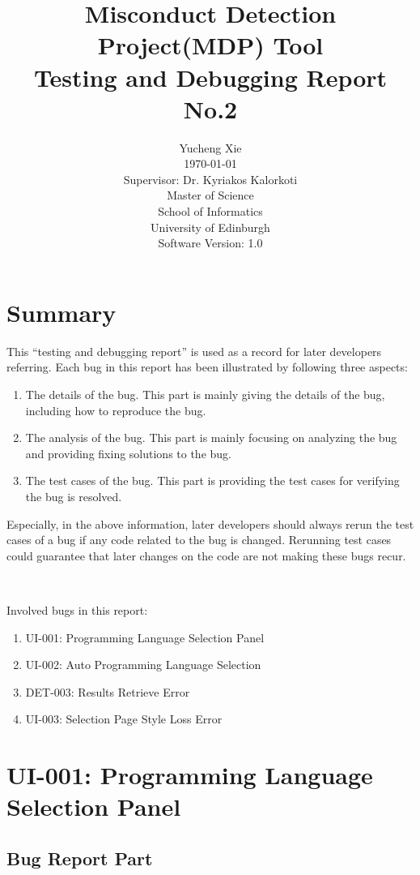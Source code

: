 \documentclass[twoside,a4paper]{refart}
\title{Misconduct Detection Project(MDP) Tool\\
Testing and Debugging Report No.2}
\author{Yucheng Xie \\
\today \\
Supervisor: Dr. Kyriakos Kalorkoti\\
Master of Science\\
School of Informatics\\
University of Edinburgh\\
Software Version: 1.0}
\date{}
\newcommand{\bugfirst}{UI-001: Programming Language Selection Panel}
\newcommand{\bugsecond}{UI-002: Auto Programming Language Selection}
\newcommand{\bugthird}{DET-003: Results Retrieve Error}
\newcommand{\bugfourth}{UI-003: Selection Page Style Loss Error}
\begin{document}
\maketitle

\tableofcontents

\newpage



\section{Summary} \label{sec:intr}
This \enquote{testing and debugging report} is used as a record for later developers referring. Each bug in this report has been illustrated by following three aspects:
\begin{enumerate}
\item The details of the bug. This part is mainly giving the details of the bug, including how to reproduce the bug.
\item The analysis of the bug. This part is mainly focusing on analyzing the bug and providing fixing solutions to the bug.
\item The test cases of the bug. This part is providing the test cases for verifying the bug is resolved.
\end{enumerate}

Especially, in the above information, later developers should always rerun the test cases of a bug if any code related to the bug is changed. Rerunning test cases could guarantee that later changes on the code are not making these bugs recur.

$\ $

Involved bugs in this report:
\begin{enumerate}
\item \bugfirst
\item \bugsecond
\item \bugthird
\item \bugfourth
\end{enumerate}


\section{\bugfirst}
\subsection{Bug Report Part}
\end{document}
